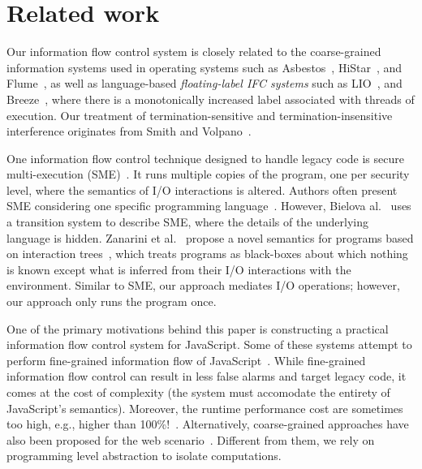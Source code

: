 \documentclass{sigplanconf}
\newcommand{\Red}[1]{{\color{red} #1}}
\begin{document}
\section{Related work}
\label{sec:related}




Our information flow control system is closely related
to the coarse-grained information systems used in operating systems such
as Asbestos~\cite{efstathopoulos:asbestos}, 
HiStar~\cite{Zeldovich:2006}, and Flume~\cite{krohn:flume}, as well as language-based
\emph{floating-label IFC systems} such as LIO~\cite{lio},
and Breeze~\cite{Hritcu:2013:YIB:2497621.2498098}, where there is a
monotonically increased label
associated with threads of execution.
Our treatment of termination-sensitive and termination-insensitive interference
originates from Smith and Volpano~\cite{Smith:Volpano:MultiThreaded,Volpano:1997:ECF:794197.795081}.

One information flow control technique designed to handle legacy code is
secure multi-execution (SME)~\cite{Devriese:2010}. It runs
multiple copies of the program, one per security level, where the semantics of
I/O interactions is altered. Authors often present
SME considering one specific programming
language~\cite{KULeuven-350547,Rafnson:2013}. However, Bielova
al.~\cite{Biel-etal-11-TR} uses a transition system to describe SME, where the
details of the underlying language is hidden.  Zanarini et
al.~\cite{ZanariniJR13} propose a novel semantics for programs based on
interaction trees~\cite{jacobs-tutorial}, which treats programs as black-boxes
about which nothing is known except what is inferred from their I/O interactions
with the environment. Similar to SME, our approach mediates I/O
operations; however, our approach only runs the program once.


One of the primary motivations behind this paper is constructing a practical
information flow control system for JavaScript.  Some of these systems attempt
to perform fine-grained information flow of
JavaScript~\cite{Hedin:2012,ConDOM,JSFlow}. While fine-grained information flow
control can result in less false alarms and target legacy code, it comes at the
cost of complexity (the system must accomodate the entirety of JavaScript's
semantics). Moreover, the runtime performance cost are sometimes too high, e.g.,
higher than 100\%!~\cite{JSFlow}.  Alternatively, coarse-grained approaches have
also been proposed for the web
scenario~\cite{Yip:2009:PBS,DeGroef:2012,conf/esorics/AkhaweLHSS13}. \Red{Different
from them, we rely on programming level abstraction to isolate
computations.}
\end{document}

